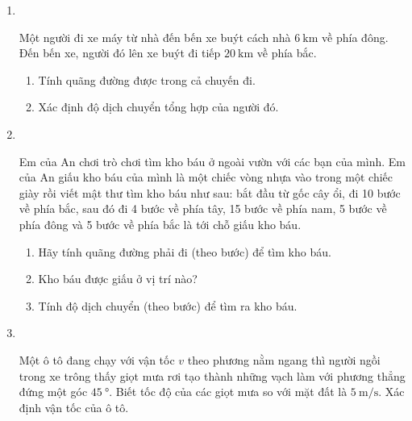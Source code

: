 \begin{enumerate}[label=\bfseries Bài \arabic*:]
\item {}\\
{Một người đi xe máy từ nhà đến bến xe buýt cách nhà $\SI{6}{\kilo\meter}$ về phía đông. Đến bến xe, người đó lên xe buýt đi tiếp $\SI{20}{\kilo\meter}$ về phía bắc.
\begin{enumerate}[label=\alph*)]
	\item Tính quãng đường được trong cả chuyến đi.
	\item Xác định độ dịch chuyển tổng hợp của người đó.
\end{enumerate}
}


\item {}\\
{Em của An chơi trò chơi tìm kho báu ở ngoài vườn với các bạn của mình. Em của An giấu kho báu của mình là một chiếc vòng nhựa vào trong một chiếc giày rồi viết mật thư tìm kho báu như sau: bắt đầu từ gốc cây ổi, đi 10 bước về phía bắc, sau đó đi 4 bước về phía tây, 15 bước về phía nam, 5 bước về phía đông và 5 bước về phía bắc là tới chỗ giấu kho báu.
	\begin{enumerate}[label=\alph*)]
		\item Hãy tính quãng đường phải đi (theo bước) để tìm kho báu.
		\item Kho báu được giấu ở vị trí nào?
		\item Tính độ dịch chuyển (theo bước) để tìm ra kho báu.
	\end{enumerate}

}


\item {}\\
{Một ô tô đang chạy với vận tốc $v$ theo phương nằm ngang thì người ngồi trong xe trông thấy giọt mưa rơi tạo thành những vạch làm với phương thẳng đứng một góc $\SI{45}{\degree}$. Biết tốc độ của các giọt mưa so với mặt đất là $\SI{5}{\meter/\second}$. Xác định vận tốc của ô tô.

}
\end{enumerate}
